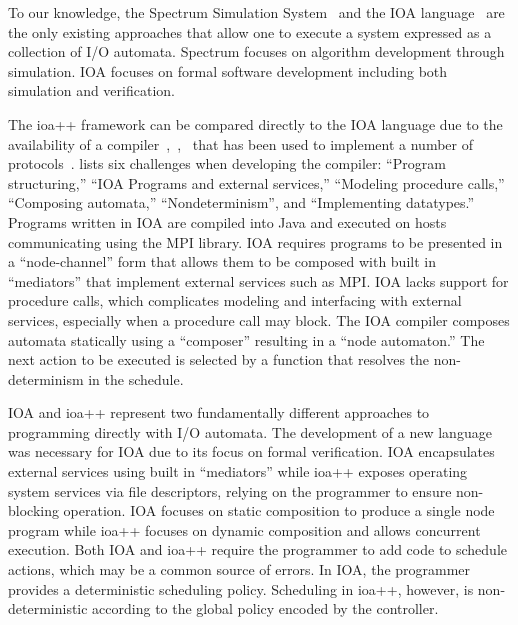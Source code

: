 To our knowledge, the Spectrum Simulation System~\cite{goldman1990distributed} and the IOA language~\cite{garland2003ioa} are the only existing approaches that allow one to execute a system expressed as a collection of I/O automata.
Spectrum focuses on algorithm development through simulation.
IOA focuses on formal software development including both simulation and verification.

The ioa++ framework can be compared directly to the IOA language due to the availability of a compiler~\cite{tsai2002code},~\cite{tauber2004verifiable},~\cite{tauber2004compiling} that has been used to implement a number of protocols~\cite{georgiou2009automated}.
\cite{georgiou2009automated} lists six challenges when developing the compiler: ``Program structuring,'' ``IOA Programs and external services,'' ``Modeling procedure calls,'' ``Composing automata,'' ``Nondeterminism'', and ``Implementing datatypes.''
Programs written in IOA are compiled into Java and executed on hosts communicating using the MPI library.
IOA requires programs to be presented in a ``node-channel'' form that allows them to be composed with built in ``mediators'' that implement external services such as MPI.
IOA lacks support for procedure calls, which complicates modeling and interfacing with external services, especially when a procedure call may block.
The IOA compiler composes automata statically using a ``composer'' resulting in a ``node automaton.''
The next action to be executed is selected by a function that resolves the non-determinism in the schedule.

IOA and ioa++ represent two fundamentally different approaches to programming directly with I/O automata.
The development of a new language was necessary for IOA due to its focus on formal verification.
IOA encapsulates external services using built in ``mediators'' while ioa++ exposes operating system services via file descriptors, relying on the programmer to ensure non-blocking operation.
IOA focuses on static composition to produce a single node program while ioa++ focuses on dynamic composition and allows concurrent execution.
Both IOA and ioa++ require the programmer to add code to schedule actions, which may be a common source of errors.
In IOA, the programmer provides a deterministic scheduling policy.
Scheduling in ioa++, however, is non-deterministic according to the global policy encoded by the controller.


